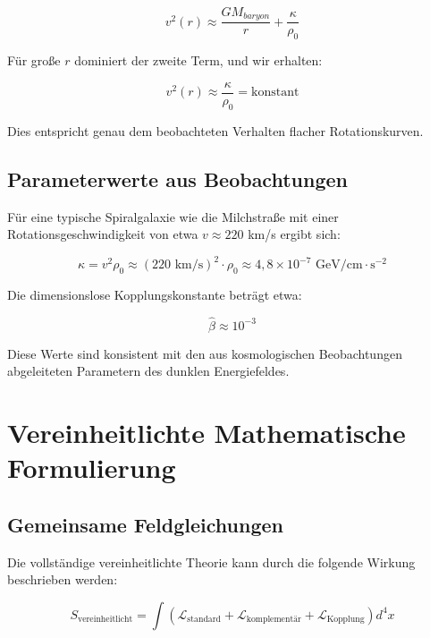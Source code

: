 \documentclass[a4paper,12pt]{article}
\begin{document}
	\begin{equation}
		v^2(r) \approx \frac{GM_{baryon}}{r} + \frac{\kappa}{\rho_0}
	\end{equation}
	
	Für große $r$ dominiert der zweite Term, und wir erhalten:
	
	\begin{equation}
		v^2(r) \approx \frac{\kappa}{\rho_0} = \text{konstant}
	\end{equation}
	
	Dies entspricht genau dem beobachteten Verhalten flacher Rotationskurven.
	
	\subsection{Parameterwerte aus Beobachtungen}
	
	Für eine typische Spiralgalaxie wie die Milchstraße mit einer Rotationsgeschwindigkeit von etwa $v \approx 220$ km/s ergibt sich:
	
	\begin{equation}
		\kappa = v^2 \rho_0 \approx (220 \text{ km/s})^2 \cdot \rho_0 \approx 4,8 \times 10^{-7} \text{ GeV/cm} \cdot \text{s}^{-2}
	\end{equation}
	
	Die dimensionslose Kopplungskonstante beträgt etwa:
	
	\begin{equation}
		\hat{\beta} \approx 10^{-3}
	\end{equation}
	
	Diese Werte sind konsistent mit den aus kosmologischen Beobachtungen abgeleiteten Parametern des dunklen Energiefeldes.
	
	\section{Vereinheitlichte Mathematische Formulierung}
	
	\subsection{Gemeinsame Feldgleichungen}
	
	Die vollständige vereinheitlichte Theorie kann durch die folgende Wirkung beschrieben werden:
	
	\begin{equation}
		S_\text{vereinheitlicht} = \int \left( \mathcal{L}_\text{standard} + \mathcal{L}_\text{komplementär} + \mathcal{L}_\text{Kopplung} \right) d^4x
	\end{equation}
	
\end{document}
